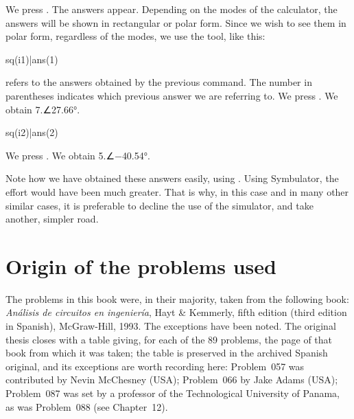 We press . The answers appear. Depending on the modes of
the calculator, the answers will be shown in rectangular or polar
form. Since we wish to see them in polar form, regardless of the
modes, we use the  tool, like this:

\begin{entry}
sq\absang(i1)|ans(1)
\end{entry}

 refers to the answers obtained by the previous
command. The number in parentheses indicates which previous answer
we are referring to. We press . We obtain 7.∠27.66°.

\begin{entry}
sq\absang(i2)|ans(2)
\end{entry}

We press . We obtain 5.∠$-$40.54°.

Note how we have obtained these answers easily, using .
Using Symbulator, the effort would have been much greater. That is
why, in this case and in many other similar cases, it is preferable
to decline the use of the simulator, and take another, simpler road.

\chapter{Origin of the problems used}

The problems in this book were, in their majority, taken from the
following book: \emph{An\'alisis de circuitos en ingenier\'ia}, Hayt
\& Kemmerly, fifth edition (third edition in Spanish), McGraw-Hill,
1993. The exceptions have been noted. The original thesis closes
with a table giving, for each of the 89 problems, the page of that
book from which it was taken; the table is preserved in the archived
Spanish original, and its exceptions are worth recording here:
Problem~057 was contributed by Nevin McChesney (USA); Problem~066 by
Jake Adams (USA); Problem~087 was set by a professor of the
Technological University of Panama, as was Problem~088 (see
Chapter~12).
